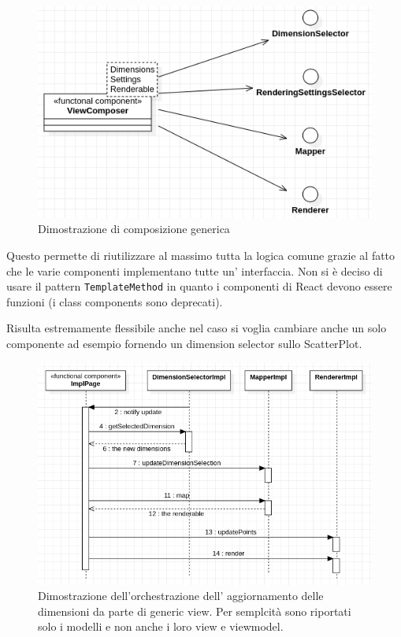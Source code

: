 \begin{figure}[h!]
  \centering
  \includegraphics[scale=0.55]{../../assets/classi_uml/comdelcomposer.png}
  \caption{Dimostrazione di composizione generica}
\end{figure}

Questo permette di riutilizzare al massimo tutta la logica comune grazie al fatto
che le varie componenti implementano tutte un' interfaccia. Non si è deciso di usare
il pattern \texttt{TemplateMethod} in quanto i componenti di React devono essere
funzioni (i class components sono deprecati).

Risulta estremamente flessibile anche nel caso si voglia cambiare anche un solo
componente ad esempio fornendo un dimension selector sullo ScatterPlot.

\begin{figure}[h!]
  \centering
  \includegraphics[scale=0.55]{../../assets/classi_uml/interazione_gw.png}
  \caption{Dimostrazione dell'orchestrazione dell' aggiornamento delle
    dimensioni da parte di generic view. Per semplcità sono riportati solo i modelli e non anche i loro view e viewmodel.}
\end{figure}

